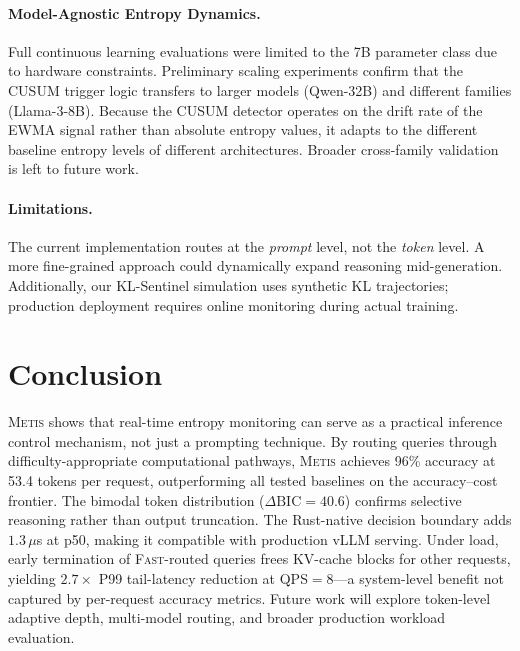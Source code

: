 \documentclass[11pt,a4paper]{article}
\newcommand{\metis}{\textsc{Metis}}
\begin{document}
\paragraph{Model-Agnostic Entropy Dynamics.}
Full continuous learning evaluations were limited to the 7B parameter class due to hardware constraints. Preliminary scaling experiments confirm that the CUSUM trigger logic transfers to larger models (Qwen-32B) and different families (Llama-3-8B). Because the CUSUM detector operates on the drift rate of the EWMA signal rather than absolute entropy values, it adapts to the different baseline entropy levels of different architectures. Broader cross-family validation is left to future work.

\paragraph{Limitations.}
The current implementation routes at the \emph{prompt} level, not the \emph{token} level. A more fine-grained approach could dynamically expand reasoning mid-generation. Additionally, our KL-Sentinel simulation uses synthetic KL trajectories; production deployment requires online monitoring during actual training.

\section{Conclusion}
\label{sec:conclusion}

\metis{} shows that real-time entropy monitoring can serve as a practical inference control mechanism, not just a prompting technique. By routing queries through difficulty-appropriate computational pathways, \metis{} achieves 96\% accuracy at 53.4 tokens per request, outperforming all tested baselines on the accuracy--cost frontier. The bimodal token distribution ($\Delta\text{BIC}=40.6$) confirms selective reasoning rather than output truncation. The Rust-native decision boundary adds $1.3\,\mu$s at p50, making it compatible with production vLLM serving. Under load, early termination of \textsc{Fast}-routed queries frees KV-cache blocks for other requests, yielding $2.7\times$ P99 tail-latency reduction at QPS${=}8$---a system-level benefit not captured by per-request accuracy metrics. Future work will explore token-level adaptive depth, multi-model routing, and broader production workload evaluation.
\end{document}
